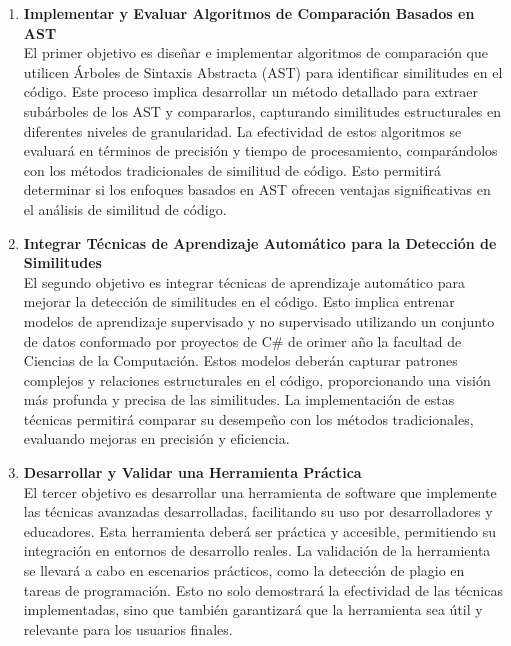\renewcommand{\labelenumi}{\Roman{enumi}.}
\begin{enumerate}
	\item {\bf Implementar y Evaluar Algoritmos de Comparación Basados en AST}\\
	El primer objetivo es diseñar e implementar algoritmos de comparación que utilicen Árboles de Sintaxis Abstracta (AST) para identificar similitudes en el código. Este proceso implica desarrollar un método detallado para extraer subárboles de los AST y compararlos, capturando similitudes estructurales en diferentes niveles de granularidad. La efectividad de estos algoritmos se evaluará en términos de precisión y tiempo de procesamiento, comparándolos con los métodos tradicionales de similitud de código. Esto permitirá determinar si los enfoques basados en AST ofrecen ventajas significativas en el análisis de similitud de código.
	
	\item {\bf Integrar Técnicas de Aprendizaje Automático para la Detección de Similitudes} \\
El segundo objetivo es integrar técnicas de aprendizaje automático para mejorar la detección de similitudes en el código. Esto implica entrenar modelos de aprendizaje supervisado y no supervisado utilizando un conjunto de datos conformado por proyectos de C\# de orimer año la facultad de Ciencias de la Computación. Estos modelos deberán capturar patrones complejos y relaciones estructurales en el código, proporcionando una visión más profunda y precisa de las similitudes. La implementación de estas técnicas permitirá comparar su desempeño con los métodos tradicionales, evaluando mejoras en precisión y eficiencia.

	\item {\bf Desarrollar y Validar una Herramienta Práctica} \\
El tercer objetivo es desarrollar una herramienta de software que implemente las técnicas avanzadas desarrolladas, facilitando su uso por desarrolladores y educadores. Esta herramienta deberá ser práctica y accesible, permitiendo su integración en entornos de desarrollo reales. La validación de la herramienta se llevará a cabo en escenarios prácticos, como la detección de plagio en tareas de programación. Esto no solo demostrará la efectividad de las técnicas implementadas, sino que también garantizará que la herramienta sea útil y relevante para los usuarios finales.


\end{enumerate}
